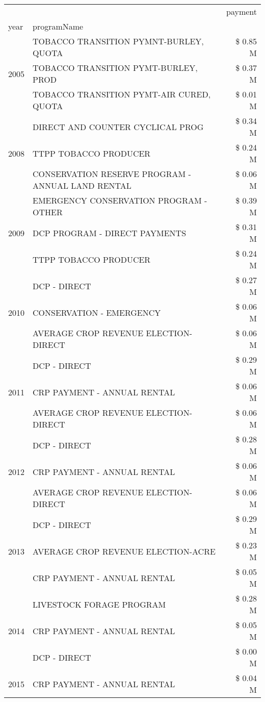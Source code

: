 \begin{tabular}{llr}
\toprule
 &  & payment \\
year & programName &  \\
\midrule
\multirow[t]{3}{*}{2005} & TOBACCO TRANSITION PYMNT-BURLEY, QUOTA & \$ 0.85 M \\
 & TOBACCO TRANSITION PYMT-BURLEY, PROD & \$ 0.37 M \\
 & TOBACCO TRANSITION PYMT-AIR CURED, QUOTA & \$ 0.01 M \\
\cline{1-3}
\multirow[t]{3}{*}{2008} & DIRECT AND COUNTER CYCLICAL PROG & \$ 0.34 M \\
 & TTPP TOBACCO PRODUCER & \$ 0.24 M \\
 & CONSERVATION RESERVE PROGRAM - ANNUAL LAND RENTAL & \$ 0.06 M \\
\cline{1-3}
\multirow[t]{3}{*}{2009} & EMERGENCY CONSERVATION PROGRAM - OTHER & \$ 0.39 M \\
 & DCP PROGRAM - DIRECT PAYMENTS & \$ 0.31 M \\
 & TTPP TOBACCO PRODUCER & \$ 0.24 M \\
\cline{1-3}
\multirow[t]{3}{*}{2010} & DCP - DIRECT & \$ 0.27 M \\
 & CONSERVATION - EMERGENCY & \$ 0.06 M \\
 & AVERAGE CROP REVENUE ELECTION-DIRECT & \$ 0.06 M \\
\cline{1-3}
\multirow[t]{3}{*}{2011} & DCP - DIRECT & \$ 0.29 M \\
 & CRP PAYMENT - ANNUAL RENTAL & \$ 0.06 M \\
 & AVERAGE CROP REVENUE ELECTION-DIRECT & \$ 0.06 M \\
\cline{1-3}
\multirow[t]{3}{*}{2012} & DCP - DIRECT & \$ 0.28 M \\
 & CRP PAYMENT - ANNUAL RENTAL & \$ 0.06 M \\
 & AVERAGE CROP REVENUE ELECTION-DIRECT & \$ 0.06 M \\
\cline{1-3}
\multirow[t]{3}{*}{2013} & DCP - DIRECT & \$ 0.29 M \\
 & AVERAGE CROP REVENUE ELECTION-ACRE & \$ 0.23 M \\
 & CRP PAYMENT - ANNUAL RENTAL & \$ 0.05 M \\
\cline{1-3}
\multirow[t]{3}{*}{2014} & LIVESTOCK FORAGE PROGRAM & \$ 0.28 M \\
 & CRP PAYMENT - ANNUAL RENTAL & \$ 0.05 M \\
 & DCP - DIRECT & \$ 0.00 M \\
\cline{1-3}
\multirow[t]{3}{*}{2015} & CRP PAYMENT - ANNUAL RENTAL & \$ 0.04 M \\

\end{tabular}
